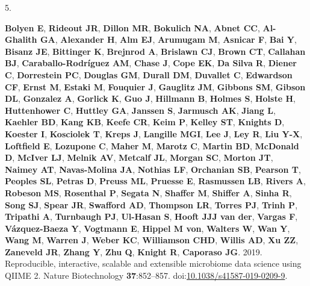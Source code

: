 \documentclass[
]{article}
\newlength{\cslhangindent}
\newlength{\csllabelwidth}
\newlength{\cslentryspacingunit} %
\newenvironment{CSLReferences}[2] %
 {%
  \setlength{\parindent}{0pt}
  \ifodd #1
  \let\oldpar\par
  \def\par{\hangindent=\cslhangindent\oldpar}
  \fi
  \setlength{\parskip}{#2\cslentryspacingunit}
 }%
 {}
\newcommand{\CSLLeftMargin}[1]{\parbox[t]{\csllabelwidth}{#1}}
\newcommand{\CSLRightInline}[1]{\parbox[t]{\linewidth - \csllabelwidth}{#1}\break}
\begin{document}
\begin{CSLReferences}{0}{1}
\leavevmode{}%
\CSLLeftMargin{5. }%
\CSLRightInline{\textbf{Bolyen E}, \textbf{Rideout JR}, \textbf{Dillon
MR}, \textbf{Bokulich NA}, \textbf{Abnet CC}, \textbf{Al-Ghalith GA},
\textbf{Alexander H}, \textbf{Alm EJ}, \textbf{Arumugam M},
\textbf{Asnicar F}, \textbf{Bai Y}, \textbf{Bisanz JE},
\textbf{Bittinger K}, \textbf{Brejnrod A}, \textbf{Brislawn CJ},
\textbf{Brown CT}, \textbf{Callahan BJ}, \textbf{Caraballo-Rodríguez
AM}, \textbf{Chase J}, \textbf{Cope EK}, \textbf{Da Silva R},
\textbf{Diener C}, \textbf{Dorrestein PC}, \textbf{Douglas GM},
\textbf{Durall DM}, \textbf{Duvallet C}, \textbf{Edwardson CF},
\textbf{Ernst M}, \textbf{Estaki M}, \textbf{Fouquier J},
\textbf{Gauglitz JM}, \textbf{Gibbons SM}, \textbf{Gibson DL},
\textbf{Gonzalez A}, \textbf{Gorlick K}, \textbf{Guo J},
\textbf{Hillmann B}, \textbf{Holmes S}, \textbf{Holste H},
\textbf{Huttenhower C}, \textbf{Huttley GA}, \textbf{Janssen S},
\textbf{Jarmusch AK}, \textbf{Jiang L}, \textbf{Kaehler BD},
\textbf{Kang KB}, \textbf{Keefe CR}, \textbf{Keim P}, \textbf{Kelley
ST}, \textbf{Knights D}, \textbf{Koester I}, \textbf{Kosciolek T},
\textbf{Kreps J}, \textbf{Langille MGI}, \textbf{Lee J}, \textbf{Ley R},
\textbf{Liu Y-X}, \textbf{Loftfield E}, \textbf{Lozupone C},
\textbf{Maher M}, \textbf{Marotz C}, \textbf{Martin BD},
\textbf{McDonald D}, \textbf{McIver LJ}, \textbf{Melnik AV},
\textbf{Metcalf JL}, \textbf{Morgan SC}, \textbf{Morton JT},
\textbf{Naimey AT}, \textbf{Navas-Molina JA}, \textbf{Nothias LF},
\textbf{Orchanian SB}, \textbf{Pearson T}, \textbf{Peoples SL},
\textbf{Petras D}, \textbf{Preuss ML}, \textbf{Pruesse E},
\textbf{Rasmussen LB}, \textbf{Rivers A}, \textbf{Robeson MS},
\textbf{Rosenthal P}, \textbf{Segata N}, \textbf{Shaffer M},
\textbf{Shiffer A}, \textbf{Sinha R}, \textbf{Song SJ}, \textbf{Spear
JR}, \textbf{Swafford AD}, \textbf{Thompson LR}, \textbf{Torres PJ},
\textbf{Trinh P}, \textbf{Tripathi A}, \textbf{Turnbaugh PJ},
\textbf{Ul-Hasan S}, \textbf{Hooft JJJ van der}, \textbf{Vargas F},
\textbf{Vázquez-Baeza Y}, \textbf{Vogtmann E}, \textbf{Hippel M von},
\textbf{Walters W}, \textbf{Wan Y}, \textbf{Wang M}, \textbf{Warren J},
\textbf{Weber KC}, \textbf{Williamson CHD}, \textbf{Willis AD},
\textbf{Xu ZZ}, \textbf{Zaneveld JR}, \textbf{Zhang Y}, \textbf{Zhu Q},
\textbf{Knight R}, \textbf{Caporaso JG}. 2019. Reproducible,
interactive, scalable and extensible microbiome data science using QIIME
2. Nature Biotechnology \textbf{37}:852--857.
doi:\href{https://doi.org/10.1038/s41587-019-0209-9}{10.1038/s41587-019-0209-9}.}


\end{CSLReferences}
\end{document}
